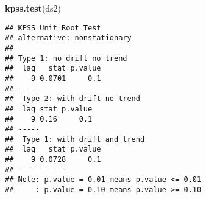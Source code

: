 \documentclass[]{article}
\newenvironment{Shaded}{\begin{snugshade}}{\end{snugshade}}
\newcommand{\KeywordTok}[1]{\textcolor[rgb]{0.13,0.29,0.53}{\textbf{#1}}}
\newcommand{\NormalTok}[1]{#1}
\begin{document}
\begin{Shaded}
\begin{Highlighting}[]
\KeywordTok{kpss.test}\NormalTok{(ds2)}
\end{Highlighting}
\end{Shaded}

\begin{multicols}{2}\begin{Verbatim}[fontsize=\small]
## KPSS Unit Root Test
## alternative: nonstationary
##
## Type 1: no drift no trend
##  lag   stat p.value
##    9 0.0701     0.1
## -----
##  Type 2: with drift no trend
##  lag stat p.value
##    9 0.16     0.1
## -----
##  Type 1: with drift and trend
##  lag   stat p.value
##    9 0.0728     0.1
## -----------
## Note: p.value = 0.01 means p.value <= 0.01
##     : p.value = 0.10 means p.value >= 0.10
\end{Verbatim}\end{multicols}
\end{document}

